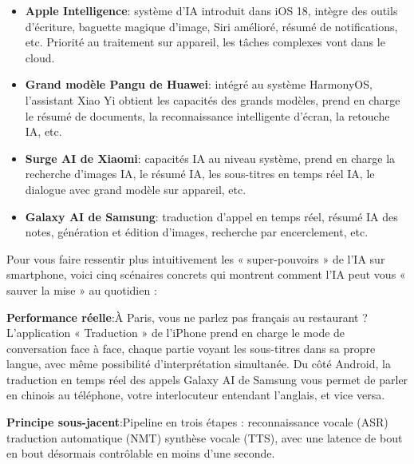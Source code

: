 
\begin{itemize}
  \item \textbf{Apple Intelligence}: système d'IA introduit dans iOS 18, intègre des outils d'écriture, baguette magique d'image, Siri amélioré, résumé de notifications, etc. Priorité au traitement sur appareil, les tâches complexes vont dans le cloud.
  \item \textbf{Grand modèle Pangu de Huawei}: intégré au système HarmonyOS, l'assistant Xiao Yi obtient les capacités des grands modèles, prend en charge le résumé de documents, la reconnaissance intelligente d'écran, la retouche IA, etc.
  \item \textbf{Surge AI de Xiaomi}: capacités IA au niveau système, prend en charge la recherche d'images IA, le résumé IA, les sous-titres en temps réel IA, le dialogue avec grand modèle sur appareil, etc.
  \item \textbf{Galaxy AI de Samsung}: traduction d'appel en temps réel, résumé IA des notes, génération et édition d'images, recherche par encerclement, etc.
\end{itemize}


Pour vous faire ressentir plus intuitivement les « super-pouvoirs » de l'IA sur smartphone, voici cinq scénaires concrets qui montrent comment l'IA peut vous « sauver la mise » au quotidien :


\textbf{Performance réelle}:À Paris, vous ne parlez pas français au restaurant ? L'application « Traduction » de l'iPhone prend en charge le mode de conversation face à face, chaque partie voyant les sous-titres dans sa propre langue, avec même possibilité d'interprétation simultanée. Du côté Android, la traduction en temps réel des appels Galaxy AI de Samsung vous permet de parler en chinois au téléphone, votre interlocuteur entendant l'anglais, et vice versa.

\textbf{Principe sous-jacent}:Pipeline en trois étapes : reconnaissance vocale (ASR) traduction automatique (NMT) synthèse vocale (TTS), avec une latence de bout en bout désormais contrôlable en moins d'une seconde.


